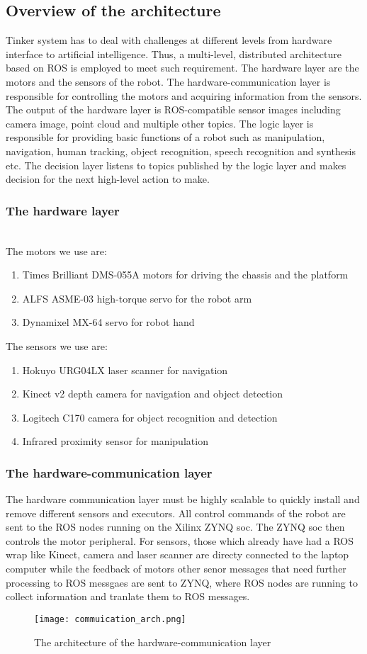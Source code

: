 \subsection{Overview of the architecture}
Tinker system has to deal with challenges at different levels from hardware interface to artificial intelligence. Thus, a multi-level, distributed architecture based on ROS is employed to meet such requirement. The hardware layer are the motors and the sensors of the robot. The hardware-communication layer is responsible for controlling the motors and acquiring information from the sensors. The output of the hardware layer is ROS-compatible sensor images including camera image, point cloud and multiple other topics. The logic layer is responsible for providing basic functions of a robot such as manipulation, navigation, human tracking, object recognition, speech recognition and synthesis etc. The decision layer listens to topics published by the logic layer and makes decision for the next high-level action to make.
\subsubsection{The hardware layer}
\\
The motors we use are:
\begin{enumerate}
    \item Times Brilliant DMS-055A motors for driving the chassis and the platform
    \item ALFS ASME-03 high-torque servo for the robot arm
    \item Dynamixel MX-64 servo for robot hand
\end{enumerate}
The sensors we use are:
\begin{enumerate}
    \item Hokuyo URG04LX laser scanner for navigation
    \item Kinect v2 depth camera for navigation and object detection
    \item Logitech C170 camera for object recognition and detection
    \item Infrared proximity sensor for manipulation
\end{enumerate}
\subsubsection{The hardware-communication layer}
The hardware communication layer must be highly scalable to quickly install and remove different sensors and executors. All control commands of the robot are sent to the ROS nodes running on the Xilinx ZYNQ soc. The ZYNQ soc then controls the motor peripheral. 
For sensors, those which already have had a ROS wrap like Kinect, camera and laser scanner are directy connected to the laptop computer while the feedback of motors other senor messages that need further processing to ROS messgaes are sent to ZYNQ, where ROS nodes are running to collect information and tranlate them to ROS messages.
\begin{figure}[!t]
	\centering
    \texttt{[image: commuication\_arch.png]}
    \caption{The architecture of the hardware-communication layer}
    \label{arch_comm}
\end{figure}

